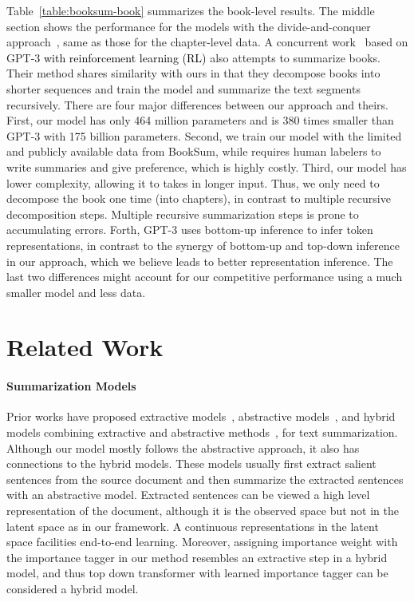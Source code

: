 Table~\ref{table:booksum-book} summarizes the book-level results. The middle section shows the performance for the models with the divide-and-conquer approach~\citep{kryscinski2021booksum}, same as those for the chapter-level data. A concurrent work~\citep{wu2021recursively} based on GPT-3 \textcolor{black}{with reinforcement learning (RL)} also attempts to summarize books. Their method shares similarity with ours in that they decompose books into shorter sequences and train the model and summarize the text segments recursively. There are four major differences between our approach and theirs. First, our model has only 464 million parameters and is 380 times smaller than GPT-3 with 175 billion parameters. Second, we train our model with the limited and publicly available data from BookSum, while \cite{wu2021recursively} requires human labelers to write summaries and give preference, which is highly costly. Third, our model has lower complexity, allowing it to takes in longer input. Thus, we only need to decompose the book one time (into chapters), in contrast to multiple recursive decomposition steps. Multiple recursive summarization steps is prone to accumulating errors. Forth, GPT-3 uses bottom-up inference to infer token representations, in contrast to the synergy of bottom-up and top-down inference in our approach, which we believe leads to better representation inference. The last two differences might account for our competitive performance using a much smaller model and less data. 

\section{Related Work}

\paragraph{Summarization Models}
Prior works have proposed extractive models~\citep{nallapati2017summarunner, cui-hu-2021-sliding}, abstractive models~\citep{nallapati2016abstractive, zhang2020pegasus}, and hybrid models combining extractive and abstractive methods~\citep{gehrmann-etal-2018-bottom, pilault-etal-2020-extractive}, for text summarization. Although our model mostly follows the abstractive approach, it also has connections to the hybrid models. These models usually first extract salient sentences from the source document and then summarize the extracted sentences with an abstractive model. Extracted sentences can be viewed a high level representation of the document, although it is the observed space but not in the latent space as in our framework. A continuous representations in the latent space facilities end-to-end learning. Moreover, assigning importance weight with the importance tagger in our method resembles an extractive step in a hybrid model, and thus top down transformer with learned importance tagger can be considered a hybrid model. 

